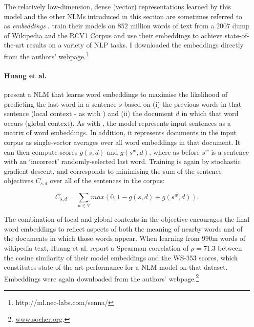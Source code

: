 The relatively low-dimension, dense (vector) representations learned by this model and the other NLMs introduced in this section are sometimes referred to as \emph{embeddings} \citep{turian2010word}. \cite{collobert2008unified} train their models on 852 million words of text from a 2007 dump of Wikipedia and the RCV1 Corpus \citep{lewis2004rcv1} and use their embeddings to achieve state-of-the-art results on a variety of NLP tasks. I downloaded the embeddings directly from the authors' webpage.\footnote{http://ml.nec-labs.com/senna/}

 \paragraph{\bf Huang et al.}

\cite{huang2012improving} present a NLM that learns word embeddings to maximise the likelihood of predicting the last word in a sentence \(s\) based on (i) the previous words in that sentence (local context - as with \cite{collobert2008unified}) and (ii) the document \( d\) in which that word occurs (global context). As with \cite{collobert2008unified}, the model represents input sentences as a matrix of word embeddings. In addition, it represents documents in the input corpus as single-vector averages over all word embeddings in that document. It can then compute scores \(g(s,d )\) and \(g(s^w, d) \), where as before \(s^w\) is a sentence with an `incorrect' randomly-selected last word. Training is again by stochastic gradient descent, and corresponds to minimising the sum of the sentence objectives \(C_{s,d} \) over all of the sentences in the corpus:

\[ C_{s,d}  = \sum_{w \in V} max(0,1-g(s,d) + g(s^w,d)). \]

The combination of local and global contexts in the objective encourages the final word embeddings to reflect aspects of both the meaning of nearby words and of the documents in which those words appear. When learning from 990m words of wikipedia text, Huang et al. report a Spearman correlation of \(\rho = 71.3\) between the cosine similarity of their model embeddings and the WS-353 scores, which constitutes state-of-the-art performance for a NLM model on that dataset. Embeddings were again downloaded from the authors' webpage.\footnote{\url{www.socher.org}.}

